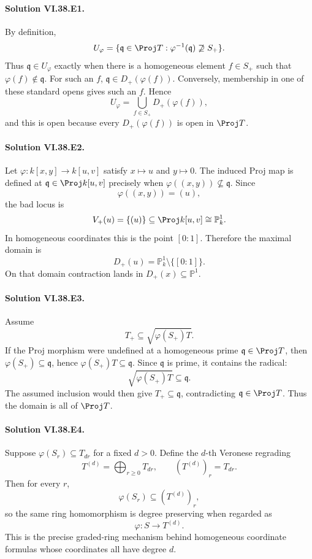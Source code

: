 
\paragraph{Solution VI.38.E1.}
By definition,
\[
U_\varphi
=
\{\mathfrak q\in\Proj T:\varphi^{-1}(\mathfrak q)\not\supseteq S_+\}.
\]
Thus \(\mathfrak q\in U_\varphi\) exactly when there is a homogeneous element
\(f\in S_+\) such that \(\varphi(f)\notin\mathfrak q\).  For such an \(f\),
\(\mathfrak q\in D_+(\varphi(f))\). Conversely, membership in one of these standard
opens gives such an \(f\). Hence
\[
\boxed{U_\varphi=\bigcup_{f\in S_+}D_+(\varphi(f))},
\]
and this is open because every \(D_+(\varphi(f))\) is open in \(\Proj T\).

\paragraph{Solution VI.38.E2.}
Let \(\varphi:k[x,y]\to k[u,v]\) satisfy \(x\mapsto u\) and \(y\mapsto0\).
The induced Proj map is defined at \(\mathfrak q\in\Proj k[u,v]\) precisely when
\(\varphi((x,y))\not\subseteq\mathfrak q\).  Since
\[
\varphi((x,y))=(u),
\]
the bad locus is
\[
V_+(u)=\{(u)\}\subseteq\Proj k[u,v]\cong\mathbb P^1_k.
\]
In homogeneous coordinates this is the point \([0:1]\). Therefore the maximal
domain is
\[
\boxed{D_+(u)=\mathbb P^1_k\setminus\{[0:1]\}}.
\]
On that domain contraction lands in \(D_+(x)\subseteq\mathbb P^1\).

\paragraph{Solution VI.38.E3.}
Assume
\[
T_+\subseteq\sqrt{\varphi(S_+)T}.
\]
If the Proj morphism were undefined at a homogeneous prime \(\mathfrak q\in\Proj T\),
then \(\varphi(S_+)\subseteq\mathfrak q\), hence
\(\varphi(S_+)T\subseteq\mathfrak q\).  Since \(\mathfrak q\) is prime, it contains
the radical:
\[
\sqrt{\varphi(S_+)T}\subseteq\mathfrak q.
\]
The assumed inclusion would then give \(T_+\subseteq\mathfrak q\), contradicting
\(\mathfrak q\in\Proj T\).  Thus the domain is all of \(\Proj T\).

\paragraph{Solution VI.38.E4.}
Suppose \(\varphi(S_r)\subseteq T_{dr}\) for a fixed \(d>0\).  Define the
\(d\)-th Veronese regrading
\[
T^{(d)}=\bigoplus_{r\ge0}T_{dr},
\qquad
(T^{(d)})_r=T_{dr}.
\]
Then for every \(r\),
\[
\varphi(S_r)\subseteq (T^{(d)})_r,
\]
so the same ring homomorphism is degree preserving when regarded as
\[
\boxed{\varphi:S\longrightarrow T^{(d)}}.
\]
This is the precise graded-ring mechanism behind homogeneous coordinate formulas
whose coordinates all have degree \(d\).

